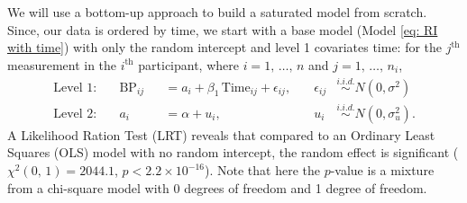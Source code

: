 \documentclass[12pt,twoside,letterpaper]{article}
\theoremstyle{definition}
\theoremstyle{definition}
\begin{document}
We will use a bottom-up approach to build a saturated model from scratch. Since, our data is ordered by time, we start with a base model (Model \ref{eq: RI with time}) with only the random intercept and level 1 covariates time: for the $j^\text{th}$ measurement in the $i^\text{th}$ participant, where $i = 1,\, \ldots,\, n$ and $j = 1,\, \ldots,\, n_i$,
\begin{equation}\label{eq: RI with time}
    \begin{aligned}
        \text{Level 1}: \quad & \text{BP}_{ij} &&= a_i + \beta_1\, \text{Time}_{ij} + \epsilon_{ij}, \quad & \epsilon_{ij} &\overset{i.i.d.}{\sim} N(0, \sigma^2) \\
        \text{Level 2}: \quad & a_i &&= \alpha + u_i, \quad & u_{i} &\overset{i.i.d.}{\sim} N(0, \sigma_u^2).
    \end{aligned}
\end{equation}
A Likelihood Ration Test (LRT) reveals that compared to an Ordinary Least Squares (OLS) model with no random intercept, the random effect is significant ($\chi^2 (0,\, 1) = 2044.1$, $p < 2.2 \times 10^{-16}$). Note that here the $p$-value is a mixture from a chi-square model with 0 degrees of freedom and 1 degree of freedom.
\end{document}

